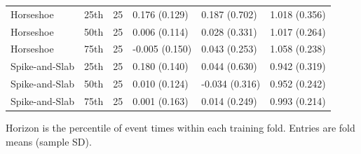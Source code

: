\begin{longtable}{@{}>{\raggedright\arraybackslash}p{3.1cm}>{\raggedright\arraybackslash}p{1.3cm}p{0.5cm}p{2.9cm}p{2.9cm}p{2.9cm}@{}}
Horseshoe & 25th & 25 & 0.176 (0.129) & 0.187 (0.702) & 1.018 (0.356) \\
Horseshoe & 50th & 25 & 0.006 (0.114) & 0.028 (0.331) & 1.017 (0.264) \\
Horseshoe & 75th & 25 & -0.005 (0.150) & 0.043 (0.253) & 1.058 (0.238) \\
Spike-and-Slab & 25th & 25 & 0.180 (0.140) & 0.044 (0.630) & 0.942 (0.319) \\
Spike-and-Slab & 50th & 25 & 0.010 (0.124) & -0.034 (0.316) & 0.952 (0.242) \\
Spike-and-Slab & 75th & 25 & 0.001 (0.163) & 0.014 (0.249) & 0.993 (0.214) \\
\end{longtable}
\noindent Horizon is the percentile of event times within each training fold. Entries are fold means (sample SD).\par\endgroup
\clearpage\begingroup\singlespacing\footnotesize
\setlength{\LTpre}{6pt}\setlength{\LTpost}{6pt}
